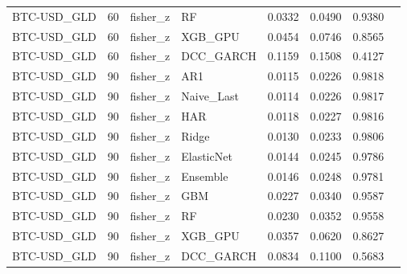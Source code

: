 \begin{table}[H]
\begin{tabular}{llllrrrr}
BTC-USD_GLD & 60 & fisher_z & RF & 0.0332 & 0.0490 & 0.9380 &  \\
BTC-USD_GLD & 60 & fisher_z & XGB_GPU & 0.0454 & 0.0746 & 0.8565 &  \\
BTC-USD_GLD & 60 & fisher_z & DCC_GARCH & 0.1159 & 0.1508 & 0.4127 &  \\
BTC-USD_GLD & 90 & fisher_z & AR1 & 0.0115 & 0.0226 & 0.9818 &  \\
BTC-USD_GLD & 90 & fisher_z & Naive_Last & 0.0114 & 0.0226 & 0.9817 &  \\
BTC-USD_GLD & 90 & fisher_z & HAR & 0.0118 & 0.0227 & 0.9816 &  \\
BTC-USD_GLD & 90 & fisher_z & Ridge & 0.0130 & 0.0233 & 0.9806 &  \\
BTC-USD_GLD & 90 & fisher_z & ElasticNet & 0.0144 & 0.0245 & 0.9786 &  \\
BTC-USD_GLD & 90 & fisher_z & Ensemble & 0.0146 & 0.0248 & 0.9781 &  \\
BTC-USD_GLD & 90 & fisher_z & GBM & 0.0227 & 0.0340 & 0.9587 &  \\
BTC-USD_GLD & 90 & fisher_z & RF & 0.0230 & 0.0352 & 0.9558 &  \\
BTC-USD_GLD & 90 & fisher_z & XGB_GPU & 0.0357 & 0.0620 & 0.8627 &  \\
BTC-USD_GLD & 90 & fisher_z & DCC_GARCH & 0.0834 & 0.1100 & 0.5683 &  \\
\bottomrule
\end{tabular}
\end{table}